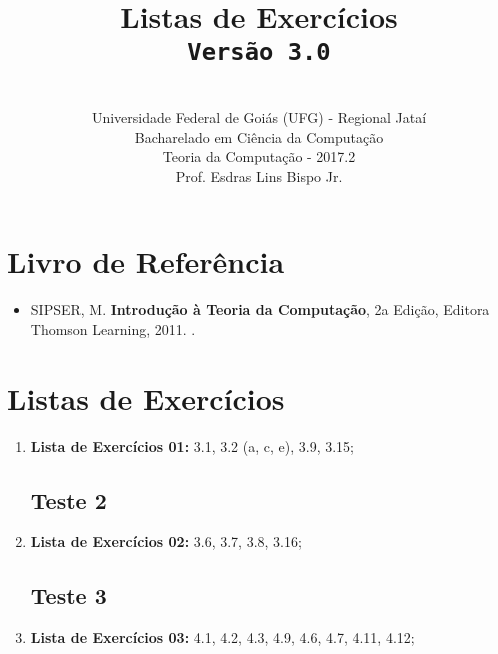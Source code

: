 \documentclass[12pt,a4paper,oneside]{article}
\author{\\Universidade Federal de Goiás (UFG) - Regional Jataí\\Bacharelado em Ciência da Computação \\Teoria da Computação - 2017.2 \\Prof. Esdras Lins Bispo Jr.}
\date{}
\title{
	\sc \huge Listas de Exercícios
	\\{\tt Versão 3.0}
}
\begin{document}
\maketitle

\section{Livro de Referência}
	\begin{itemize}
		\item SIPSER, M. {\bf Introdução à Teoria da Computação}, 2a Edição, Editora Thomson Learning, 2011. \color{blue}{\bf Código Bib.: [004 SIP/int]}.
	\end{itemize}
	
\section{Listas de Exercícios}

\begin{enumerate}

	\subsection{Teste 1}
	\item[] {\bf Lista de Exercícios 01:} 3.1, 3.2 (a, c, e), 3.9, 3.15;
	
	\subsection{Teste 2}
	
	\item[] {\bf Lista de Exercícios 02:} 3.6, 3.7, 3.8, 3.16;
%	
%	
	\subsection{Teste 3}
	\item[] {\bf Lista de Exercícios 03:} 4.1, 4.2, 4.3, 4.9, 4.6, 4.7, 4.11, 4.12;
%	
%	
	
\end{enumerate}
\end{document}
